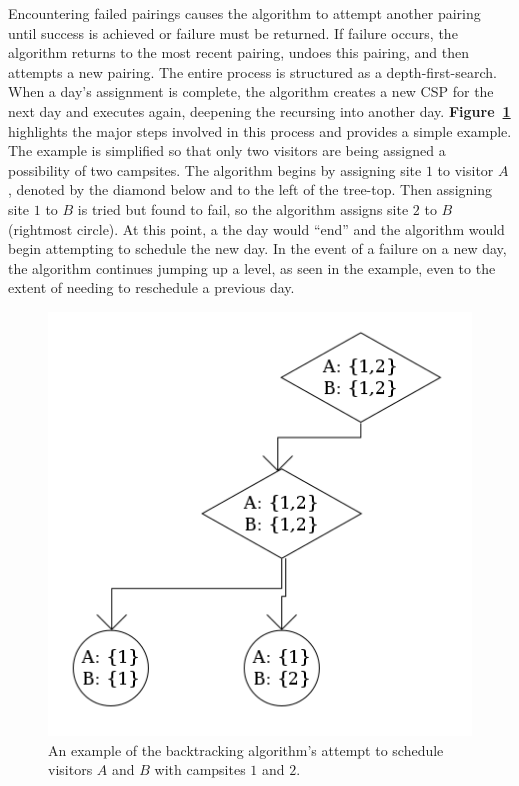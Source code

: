 \documentclass[11pt]{article} %
\begin{document}
Encountering failed pairings causes the algorithm to attempt another pairing
until success is achieved or failure must be returned.  If failure occurs,
the algorithm returns to the most recent pairing, undoes this pairing, and
then attempts a new pairing.  The entire process is structured as a
depth-first-search. When a day's assignment is complete, the algorithm creates
a new CSP for the next day and executes again, deepening the recursing into
another day.  \textbf{Figure~\ref{fig:searchExample}} highlights the major steps
involved in this process and provides a simple example.  The example is
simplified so that only two visitors are being assigned a possibility of two
campsites.  The algorithm begins by assigning site $1$ to visitor $A$, denoted
by the diamond below and to the left of the tree-top.  Then assigning
site $1$ to $B$ is tried but found to fail, so the algorithm assigns site
$2$ to $B$ (rightmost circle).  At this point, a the day would ``end'' and
the algorithm would begin attempting to schedule the new day.  In the event
of a failure on a new day, the algorithm continues jumping up a level, as
seen in the example, even to the extent of needing to reschedule a previous
day.

\begin{figure}[h]
  \centering
  \includegraphics[scale=0.5]{imgs/searchExample.png}
  \caption{An example of the backtracking algorithm's attempt to schedule
     visitors $A$ and $B$ with campsites $1$ and $2$.}
  \label{fig:searchExample}
\end{figure}
\end{document}

